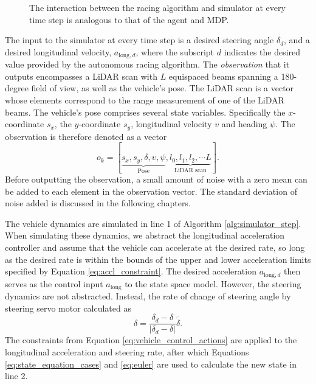 \begin{figure}[htb!]
    \centering
    
    \caption[The interaction between the ]{The interaction between the racing algorithm and simulator at every time step is analogous to that of the agent and MDP.}
    \label{fig:sim_mdp}
\end{figure}



The input to the simulator at every time step is a desired steering angle $\delta_d$, and a desired longitudinal velocity, $a_{\text{long},d}$, where the subscript $d$ indicates the desired value provided by the autonomous racing algorithm.
The \emph{observation} that it outputs encompasses a LiDAR scan with $L$ equispaced beams spanning a 180-degree field of view, as well as the vehicle's pose.
The LiDAR scan is a vector whose elements correspond to the range measurement of one of the LiDAR beams.
The vehicle's pose comprises several state variables.
Specifically the $x$-coordinate $s_x$, the $y$-coordinate $s_y$, longitudinal velocity $v$ and heading $\psi$.
The observation is therefore denoted as a vector
\begin{equation}
    o_k = [\underbrace{s_{x}, s_{y}, {\delta}, {\upsilon}, \psi}_{\text{Pose}}, \underbrace{l_0, l_1, l_2, \cdots L}_{\text{LiDAR scan}}].
\end{equation}
Before outputting the observation, a small amount of noise with a zero mean can be added to each element in the observation vector.
The standard deviation of noise added is discussed in the following chapters.




The vehicle dynamics are simulated in line 1 of Algorithm \ref{alg:simulator_step}.
When simulating these dynamics, we abstract the longitudinal acceleration controller and assume that the vehicle can accelerate at the desired rate, 
so long as the desired rate is within the bounds of the upper and lower acceleration limits specified by Equation \ref{eq:accl_constraint}.
The desired acceleration $a_{\text{long},d}$ then serves as the control input $a_{\text{long}}$ to the state space model. 
However, the steering dynamics are not abstracted.
Instead, the rate of change of steering angle by steering servo motor calculated as
\begin{equation}
    \dot{\delta} = \frac{\delta_d - \delta}{|\delta_d - \delta|} \overline{\dot{\delta}}.
\label{eq:sim_servo}
\end{equation}
The constraints from Equation \ref{eq:vehicle_control_actions} are applied to the longitudinal acceleration and steering rate, 
after which Equations \ref{eq:state_equation_cases} and \ref{eq:euler} are used to calculate the new state in line 2. 

